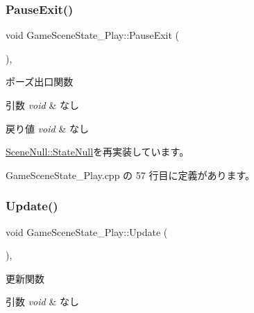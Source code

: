 \subsubsection{\texorpdfstring{Pause\+Exit()}{PauseExit()}}
{\footnotesize\ttfamily void Game\+Scene\+State\+\_\+\+Play\+::\+Pause\+Exit (\begin{DoxyParamCaption}{ }\end{DoxyParamCaption})\hspace{0.3cm}{\ttfamily [override]}, {\ttfamily [virtual]}}



ポーズ出口関数 


\begin{DoxyParams}{引数}
{\em void} & なし \\
\hline
\end{DoxyParams}

\begin{DoxyRetVals}{戻り値}
{\em void} & なし \\
\hline
\end{DoxyRetVals}


\mbox{\hyperlink{class_scene_null_1_1_state_null_acf2eecc6ee9f16b57095aa0b88192257}{Scene\+Null\+::\+State\+Null}}を再実装しています。



 Game\+Scene\+State\+\_\+\+Play.\+cpp の 57 行目に定義があります。

\mbox{\label{class_game_scene_state___play_a14fa99f6138f6c4ef8598210cdb6cc06}} 
\subsubsection{\texorpdfstring{Update()}{Update()}}
{\footnotesize\ttfamily void Game\+Scene\+State\+\_\+\+Play\+::\+Update (\begin{DoxyParamCaption}{ }\end{DoxyParamCaption})\hspace{0.3cm}{\ttfamily [override]}, {\ttfamily [virtual]}}



更新関数 


\begin{DoxyParams}{引数}
{\em void} & なし \\
\hline
\end{DoxyParams}

